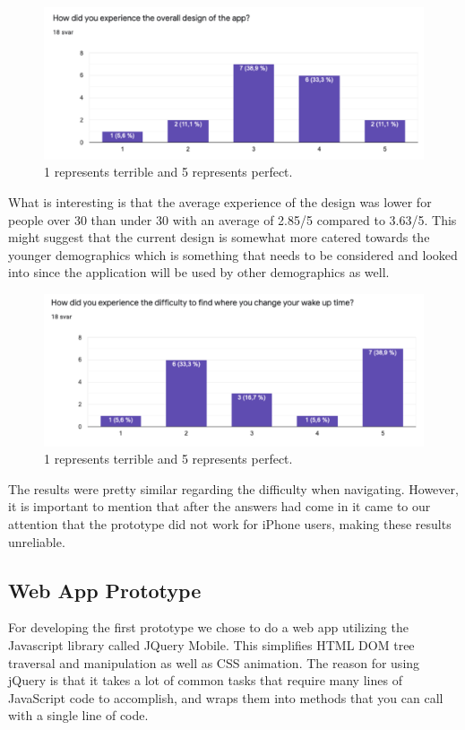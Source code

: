 \documentclass{article}
\begin{document}
\begin{figure}[!h]
  \begin{center}
    \includegraphics[scale=0.6]{Diagram2.png}
    \caption{1 represents terrible and 5 represents perfect.
}
    \label{fig:diagram2}
  \end{center}
\end{figure}

What is interesting is that the average experience of the design was lower for people over 30 than under 30 with an average of 2.85/5 compared to 3.63/5. This might suggest that the current design is somewhat more catered towards the younger demographics which is something that needs to be considered and looked into since the application will be used by other demographics as well. 
\begin{figure}[!h]
  \begin{center}
    \includegraphics[scale=0.6]{Diagram3.png}
    \caption{1 represents terrible and 5 represents perfect.
}
    \label{fig:diagram3}
  \end{center}
\end{figure}

The results were pretty similar regarding the difficulty when navigating. However, it is important to mention that after the answers had come in it came to our attention that the prototype did not work for iPhone users, making these results unreliable.

\subsection{Web App Prototype}
For developing the first prototype we chose to do a web app utilizing the Javascript library called JQuery Mobile. This simplifies HTML DOM tree traversal and manipulation as well as CSS animation. The reason for using jQuery is that it takes a lot of common tasks that require many lines of JavaScript code to accomplish, and wraps them into methods that you can call with a single line of code.
\end{document}
